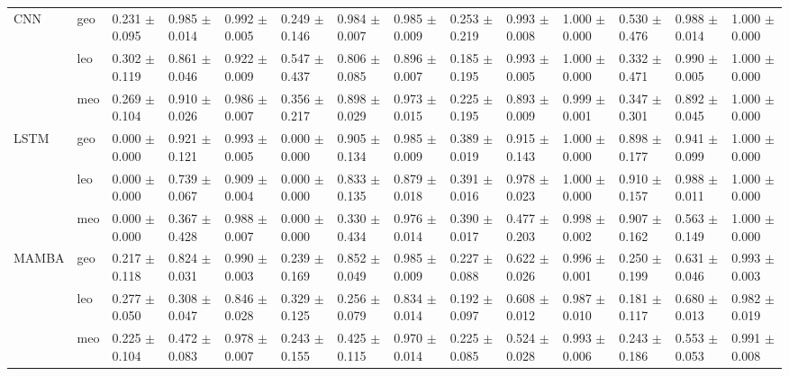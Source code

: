 \begin{table}
\begin{tabular}{llllllllllllll}
\cline{1-14}
\multirow[t]{3}{*}{CNN} & geo & 0.231 $\pm$ 0.095 & 0.985 $\pm$ 0.014 & 0.992 $\pm$ 0.005 & 0.249 $\pm$ 0.146 & 0.984 $\pm$ 0.007 & 0.985 $\pm$ 0.009 & 0.253 $\pm$ 0.219 & 0.993 $\pm$ 0.008 & 1.000 $\pm$ 0.000 & 0.530 $\pm$ 0.476 & 0.988 $\pm$ 0.014 & 1.000 $\pm$ 0.000 \\
 & leo & 0.302 $\pm$ 0.119 & 0.861 $\pm$ 0.046 & 0.922 $\pm$ 0.009 & 0.547 $\pm$ 0.437 & 0.806 $\pm$ 0.085 & 0.896 $\pm$ 0.007 & 0.185 $\pm$ 0.195 & 0.993 $\pm$ 0.005 & 1.000 $\pm$ 0.000 & 0.332 $\pm$ 0.471 & 0.990 $\pm$ 0.005 & 1.000 $\pm$ 0.000 \\
 & meo & 0.269 $\pm$ 0.104 & 0.910 $\pm$ 0.026 & 0.986 $\pm$ 0.007 & 0.356 $\pm$ 0.217 & 0.898 $\pm$ 0.029 & 0.973 $\pm$ 0.015 & 0.225 $\pm$ 0.195 & 0.893 $\pm$ 0.009 & 0.999 $\pm$ 0.001 & 0.347 $\pm$ 0.301 & 0.892 $\pm$ 0.045 & 1.000 $\pm$ 0.000 \\
\cline{1-14}
\multirow[t]{3}{*}{LSTM} & geo & 0.000 $\pm$ 0.000 & 0.921 $\pm$ 0.121 & 0.993 $\pm$ 0.005 & 0.000 $\pm$ 0.000 & 0.905 $\pm$ 0.134 & 0.985 $\pm$ 0.009 & 0.389 $\pm$ 0.019 & 0.915 $\pm$ 0.143 & 1.000 $\pm$ 0.000 & 0.898 $\pm$ 0.177 & 0.941 $\pm$ 0.099 & 1.000 $\pm$ 0.000 \\
 & leo & 0.000 $\pm$ 0.000 & 0.739 $\pm$ 0.067 & 0.909 $\pm$ 0.004 & 0.000 $\pm$ 0.000 & 0.833 $\pm$ 0.135 & 0.879 $\pm$ 0.018 & 0.391 $\pm$ 0.016 & 0.978 $\pm$ 0.023 & 1.000 $\pm$ 0.000 & 0.910 $\pm$ 0.157 & 0.988 $\pm$ 0.011 & 1.000 $\pm$ 0.000 \\
 & meo & 0.000 $\pm$ 0.000 & 0.367 $\pm$ 0.428 & 0.988 $\pm$ 0.007 & 0.000 $\pm$ 0.000 & 0.330 $\pm$ 0.434 & 0.976 $\pm$ 0.014 & 0.390 $\pm$ 0.017 & 0.477 $\pm$ 0.203 & 0.998 $\pm$ 0.002 & 0.907 $\pm$ 0.162 & 0.563 $\pm$ 0.149 & 1.000 $\pm$ 0.000 \\
\cline{1-14}
\multirow[t]{3}{*}{MAMBA} & geo & 0.217 $\pm$ 0.118 & 0.824 $\pm$ 0.031 & 0.990 $\pm$ 0.003 & 0.239 $\pm$ 0.169 & 0.852 $\pm$ 0.049 & 0.985 $\pm$ 0.009 & 0.227 $\pm$ 0.088 & 0.622 $\pm$ 0.026 & 0.996 $\pm$ 0.001 & 0.250 $\pm$ 0.199 & 0.631 $\pm$ 0.046 & 0.993 $\pm$ 0.003 \\
 & leo & 0.277 $\pm$ 0.050 & 0.308 $\pm$ 0.047 & 0.846 $\pm$ 0.028 & 0.329 $\pm$ 0.125 & 0.256 $\pm$ 0.079 & 0.834 $\pm$ 0.014 & 0.192 $\pm$ 0.097 & 0.608 $\pm$ 0.012 & 0.987 $\pm$ 0.010 & 0.181 $\pm$ 0.117 & 0.680 $\pm$ 0.013 & 0.982 $\pm$ 0.019 \\
 & meo & 0.225 $\pm$ 0.104 & 0.472 $\pm$ 0.083 & 0.978 $\pm$ 0.007 & 0.243 $\pm$ 0.155 & 0.425 $\pm$ 0.115 & 0.970 $\pm$ 0.014 & 0.225 $\pm$ 0.085 & 0.524 $\pm$ 0.028 & 0.993 $\pm$ 0.006 & 0.243 $\pm$ 0.186 & 0.553 $\pm$ 0.053 & 0.991 $\pm$ 0.008 \\

\end{tabular}
\end{table}
